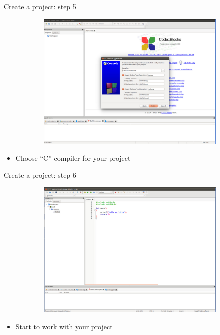 \begin{frame}{Create a project: step 5}
	\begin{figure}
		\begin{center}
			\begin{figure}
				\includegraphics[width=0.8\linewidth]{figs/cb5.pdf}
			\end{figure}
		\end{center}
	\end{figure}
	\begin{itemize}
		\item {Choose ``C'' compiler for your project}
	\end{itemize}
\end{frame}

\begin{frame}{Create a project: step 6}
	\begin{figure}
		\begin{center}
			\begin{figure}
				\includegraphics[width=0.8\linewidth]{figs/cb6.pdf}
			\end{figure}
		\end{center}
	\end{figure}
	\begin{itemize}
		\item {Start to work with your project}
	\end{itemize}
\end{frame}

